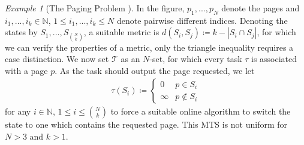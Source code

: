 \documentclass[10pt]{amsart}
\theoremstyle{definition}
\theoremstyle{remark}
\newtheorem{example}[theorem]{Example}
\begin{document}
\begin{example}[The Paging Problem {\cite[p. 124]{Borodin}}]
        In the figure, \(p_1, ..., p_N\) denote the pages and \(i_1, ..., i_k \in \mathbb{N}\), \(1 \leq i_1, ..., i_k \leq N\) denote pairwise different indices. Denoting the states by \(S_1, ..., S_{\binom{N}{k}}\), a suitable metric is \(d(S_i, S_j) \coloneqq k - |S_i \cap S_j|\), for which we can verify the properties of a metric, only the triangle inequality requires a case distinction. We now set \(\mathcal{T}\) as an \(N\)-set, for which every task \(\tau\) is associated with a page \(p\). As the task should output the page requested, we let
        \begin{align}
            \tau(S_i) \coloneqq \begin{cases}
                0 & p \in S_i\\
                \infty & p \notin S_i
            \end{cases}
        \end{align}
        for any \(i \in \mathbb{N}\), \(1 \leq i \leq \binom{N}{k}\) to force a suitable online algorithm to switch the state to one which contains the requested page. This MTS is not uniform for \(N > 3\) and \(k > 1\).
    \end{example}
\end{document}
